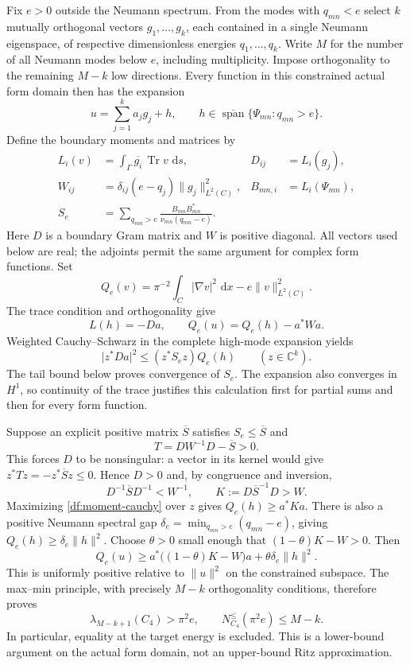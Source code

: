 \documentclass[11pt,reqno]{amsart}
\numberwithin{equation}{section}
\newcommand{\dd}{\,\mathrm d}
\newcommand{\abs}[1]{\lvert#1\rvert}
\newcommand{\norm}[1]{\lVert#1\rVert}
\begin{document}
Fix $e>0$ outside the Neumann spectrum. From the modes with $q_{mn}<e$
select $k$ mutually orthogonal vectors $g_1,\ldots,g_k$, each contained
in a single Neumann eigenspace, of respective dimensionless energies
$q_1,\ldots,q_k$. Write $M$ for the number of all Neumann modes below
$e$, including multiplicity. Impose orthogonality to the remaining
$M-k$ low directions. Every function in this constrained actual form
domain then has the expansion
\[
 u=\sum_{j=1}^k a_jg_j+h,
 \qquad
 h\in\overline{\operatorname{span}}\{\Psi_{mn}:q_{mn}>e\}.
\]
Define the boundary moments and matrices by
\begin{align*}
 L_i(v)&=\int_\Gamma \overline{g_i}\,\operatorname{Tr}v\,\dd s,
 &D_{ij}&=L_i(g_j),\\
 W_{ij}&=\delta_{ij}(e-q_j)\norm{g_j}_{L^2(C)}^2,
 &B_{mn,i}&=L_i(\Psi_{mn}),\\
 S_e&=\sum_{q_{mn}>e}
       \frac{B_{mn}B_{mn}^*}{\nu_{mn}(q_{mn}-e)}.
\end{align*}
Here $D$ is a boundary Gram matrix and $W$ is positive diagonal.
All vectors used below are real; the adjoints permit the same argument
for complex form functions. Set
\[
 Q_e(v)=\pi^{-2}\int_C\abs{\nabla v}^2\,\dd x-e\norm v_{L^2(C)}^2.
\]
The trace condition and orthogonality give
\[
 L(h)=-Da,\qquad Q_e(u)=Q_e(h)-a^*Wa.
\]
Weighted Cauchy--Schwarz in the complete high-mode expansion yields
\begin{equation}
 \abs{z^*Da}^2\le (z^*S_ez)Q_e(h)
 \qquad(z\in\mathbb C^k).
 \label{df:moment-cauchy}
\end{equation}
The tail bound below proves convergence of $S_e$. The expansion also
converges in $H^1$, so continuity of the trace justifies this calculation
first for partial sums and then for every form function.

Suppose an explicit positive matrix $\overline S$ satisfies
$S_e\le\overline S$ and
\begin{equation}
 T=DW^{-1}D-\overline S>0.
 \label{df:matrix-test}
\end{equation}
This forces $D$ to be nonsingular: a vector in its kernel would give
$z^*Tz=-z^*\overline Sz\le0$. Hence $D>0$ and, by congruence and
inversion,
\[
 D^{-1}\overline S D^{-1}<W^{-1},\qquad
 K:=D\overline S^{-1}D>W.
\]
Maximizing \eqref{df:moment-cauchy} over $z$ gives
$Q_e(h)\ge a^*Ka$. There is also a positive Neumann spectral gap
$\delta_e=\min_{q_{mn}>e}(q_{mn}-e)$, giving
$Q_e(h)\ge\delta_e\norm h^2$. Choose $\theta>0$ small enough that
$(1-\theta)K-W>0$. Then
\[
 Q_e(u)\ge
 a^*\bigl((1-\theta)K-W\bigr)a
 +\theta\delta_e\norm h^2.
\]
This is uniformly positive relative to $\norm u^2$ on the constrained
subspace. The max--min principle, with precisely $M-k$ orthogonality
conditions, therefore proves
\begin{equation}
 \lambda_{M-k+1}(C_4)>\pi^2e,
 \qquad N_{C_4}^{\le}(\pi^2e)\le M-k.
 \label{df:block-cap}
\end{equation}
In particular, equality at the target energy is excluded. This is a
lower-bound argument on the actual form domain, not an upper-bound
Ritz approximation.
\end{document}

